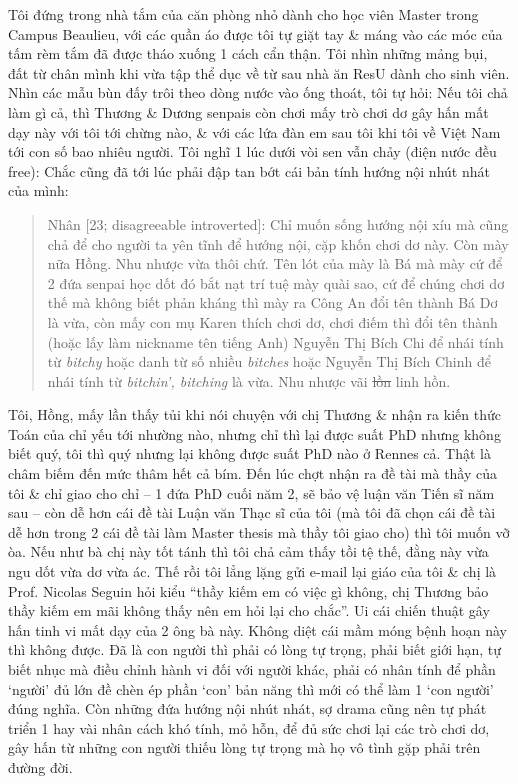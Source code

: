 \documentclass[12pt,oneside]{book}
\begin{document}
Tôi đứng trong nhà tắm của căn phòng nhỏ dành cho học viên Master trong Campus Beaulieu, với các quần áo được tôi tự giặt tay \& máng vào các móc của tấm rèm tắm đã được tháo xuống 1 cách cẩn thận. Tôi nhìn những mảng bụi, đất từ chân mình khi vừa tập thể dục về từ sau nhà ăn ResU dành cho sinh viên. Nhìn các mẫu bùn đấy trôi theo dòng nước vào ống thoát, tôi tự hỏi: Nếu tôi chả làm gì cả, thì {\sf Thương} \& {\sf Dương} senpais còn chơi mấy trò chơi dơ gây hấn mất dạy này với tôi tới chừng nào, \& với các lứa đàn em sau tôi khi tôi về Việt Nam tới con số bao nhiêu người. Tôi nghĩ 1 lúc dưới vòi sen vẫn chảy (điện nước đều free): Chắc cũng đã tới lúc phải đập tan bớt cái bản tính hướng nội nhút nhát của mình: 
\begin{quote}
	{\sf Nhân [23; disagreeable introverted]}: Chỉ muốn sống hướng nội xíu mà cũng chả để cho người ta yên tĩnh để hướng nội, cặp khốn chơi dơ này. Còn mày nữa Hồng. Nhu nhược vừa thôi chứ. Tên lót của mày là Bá mà mày cứ để 2 đứa senpai học dốt đó bắt nạt trí tuệ mày quài sao, cứ để chúng chơi dơ thế mà không biết phản kháng thì mày ra Công An đổi tên thành Bá Dơ là vừa, còn mấy con mụ Karen thích chơi dơ, chơi điếm thì đổi tên thành (hoặc lấy làm nickname tên tiếng Anh) {\sf Nguyễn Thị Bích Chi} để nhái tính từ {\it bitchy} hoặc danh từ số nhiều {\it bitches} hoặc {\sf Nguyễn Thị Bích Chinh} để nhái tính từ {\it bitchin', bitching} là vừa. Nhu nhược vãi \st{lồn} linh hồn.
\end{quote}
Tôi, {\sf Hồng}, mấy lần thấy tủi khi nói chuyện với chị {\sf Thương} \& nhận ra kiến thức Toán của chỉ yếu tới nhường nào, nhưng chỉ thì lại được suất PhD nhưng không biết quý, tôi thì quý nhưng lại không được suất PhD nào ở Rennes cả. Thật là châm biếm đến mức thâm hết cả bím. Đến lúc chợt nhận ra đề tài mà thầy của tôi \& chỉ giao cho chỉ -- 1 đứa PhD cuối năm 2, sẽ bảo vệ luận văn Tiến sĩ năm sau -- còn dễ hơn cái đề tài Luận văn Thạc sĩ của tôi (mà tôi đã chọn cái đề tài dễ hơn trong 2 cái đề tài làm Master thesis mà thầy tôi giao cho) thì tôi muốn vỡ òa. Nếu như bà chị này tốt tánh thì tôi chả cảm thấy tồi tệ thế, đằng này vừa ngu dốt vừa dơ vừa ác. Thế rồi tôi lẳng lặng gửi e-mail lại giáo của tôi \& chị là Prof. {\sc Nicolas Seguin} hỏi kiểu ``thầy kiếm em có việc gì không, chị Thương bảo thầy kiếm em mãi không thấy nên em hỏi lại cho chắc''. Ui cái chiến thuật gây hấn tinh vi mất dạy của 2 ông bà này. Không diệt cái mầm móng bệnh hoạn này thì không được. Đã là con người thì phải có lòng tự trọng, phải biết giới hạn, tự biết nhục mà điều chỉnh hành vi đối với người khác, phải có nhân tính để phần `người' đủ lớn đề chèn ép phần `con' bản năng thì mới có thể làm 1 `con người' đúng nghĩa. Còn những đứa hướng nội nhút nhát, sợ drama cũng nên tự phát triển 1 hay vài nhân cách khó tính, mỏ hỗn, để đủ sức chơi lại các trò chơi dơ, gây hấn từ những con người thiếu lòng tự trọng mà họ vô tình gặp phải trên đường đời.
\end{document}

